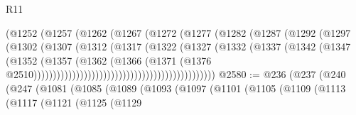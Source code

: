 \begin{lexlean}{R11}
\begin{coremodule}
{{{{{{{{{{{{{{{{{{{{{{{{{{{{{{{{{{{{{{{{{{{{{{{{{{{{{{{{{{{{{{{{{{{{{{{{{{{{{{{{{{{{{{{{{{{{{{{{{{{{{{{{{{                                              (@1252
                                                (@1257
                                                  (@1262
                                                    (@1267
                                                      (@1272
                                                        (@1277
                                                          (@1282
                                                            (@1287
                                                              (@1292
                                                                (@1297
                                                                  (@1302
                                                                    (@1307
                                                                      (@1312
                                                                        (@1317
                                                                          (@1322
                                                                            (@1327
                                                                              (@1332
                                                                                (@1337
                                                                                  (@1342
                                                                                    (@1347
                                                                                      (@1352
                                                                                        (@1357
                                                                                          (@1362
                                                                                            (@1366
                                                                                              (@1371
                                                                                                (@1376
                                                                                                  @2510)))))))))))))))))))))))))))))))))))))))))))))))
@2580 := @236
    (@237
      (@240
        (@247
          (@1081
            (@1085
              (@1089
                (@1093
                  (@1097
                    (@1101
                      (@1105
                        (@1109
                          (@1113
                            (@1117
                              (@1121
                                (@1125
                                  (@1129
}}}}}}}}}}}}}}}}}}}}}}}}}}}}}}}}}}}}}}}}}}}}}}}}}}}}}}}}}}}}}}}}}}}}}}}}}}}}}}}}}}}}}}}}}}}}}}}}}}}}}}}}}}
\end{coremodule}
\end{lexlean}

